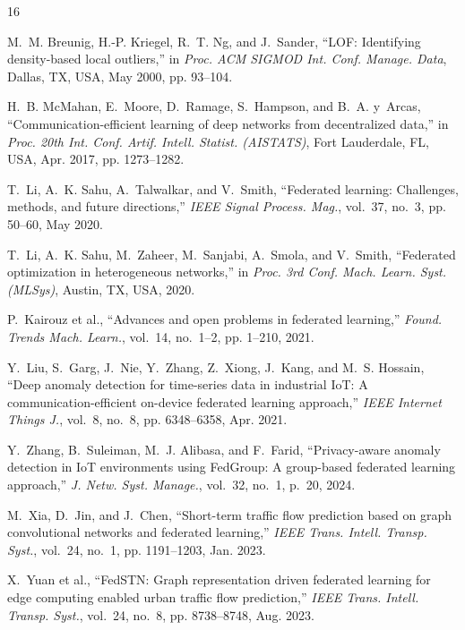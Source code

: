 \documentclass[conference]{IEEEtran}
\begin{document}
\begin{thebibliography}{16}

M.~M. Breunig, H.-P. Kriegel, R.~T. Ng, and J.~Sander,
``LOF: Identifying density-based local outliers,''
in \textit{Proc. ACM SIGMOD Int. Conf. Manage. Data},
Dallas, TX, USA, May 2000, pp. 93--104.

H.~B. McMahan, E.~Moore, D.~Ramage, S.~Hampson, and B.~A. y~Arcas,
``Communication-efficient learning of deep networks from decentralized data,''
in \textit{Proc. 20th Int. Conf. Artif. Intell. Statist. (AISTATS)},
Fort Lauderdale, FL, USA, Apr. 2017, pp. 1273--1282.

T.~Li, A.~K. Sahu, A.~Talwalkar, and V.~Smith,
``Federated learning: Challenges, methods, and future directions,''
\textit{IEEE Signal Process. Mag.}, vol.~37, no.~3, pp. 50--60, May 2020.

T.~Li, A.~K. Sahu, M.~Zaheer, M.~Sanjabi, A.~Smola, and V.~Smith,
``Federated optimization in heterogeneous networks,''
in \textit{Proc. 3rd Conf. Mach. Learn. Syst. (MLSys)},
Austin, TX, USA, 2020.

P.~Kairouz et al.,
``Advances and open problems in federated learning,''
\textit{Found. Trends Mach. Learn.}, vol.~14, no.~1--2, pp. 1--210, 2021.

Y.~Liu, S.~Garg, J.~Nie, Y.~Zhang, Z.~Xiong, J.~Kang, and M.~S. Hossain,
``Deep anomaly detection for time-series data in industrial IoT:
A communication-efficient on-device federated learning approach,''
\textit{IEEE Internet Things J.}, vol.~8, no.~8, pp. 6348--6358, Apr. 2021.

Y.~Zhang, B.~Suleiman, M.~J. Alibasa, and F.~Farid,
``Privacy-aware anomaly detection in IoT environments using FedGroup:
A group-based federated learning approach,''
\textit{J. Netw. Syst. Manage.}, vol.~32, no.~1, p.~20, 2024.

M.~Xia, D.~Jin, and J.~Chen,
``Short-term traffic flow prediction based on graph convolutional networks
and federated learning,''
\textit{IEEE Trans. Intell. Transp. Syst.}, vol.~24, no.~1,
pp. 1191--1203, Jan. 2023.

X.~Yuan et al.,
``FedSTN: Graph representation driven federated learning for edge computing
enabled urban traffic flow prediction,''
\textit{IEEE Trans. Intell. Transp. Syst.}, vol.~24, no.~8,
pp. 8738--8748, Aug. 2023.


\end{thebibliography}
\end{document}
